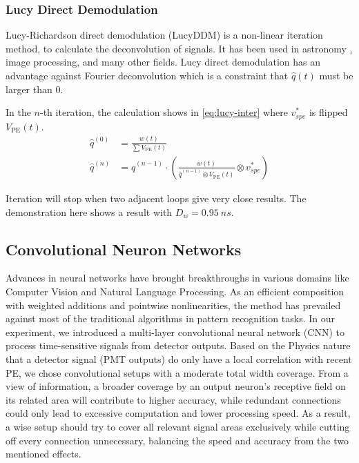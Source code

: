\subsubsection{Lucy Direct Demodulation}

Lucy-Richardson direct demodulation (LucyDDM) is a non-linear iteration method, to calculate the deconvolution of signals. It has been used in astronomy \cite{li_richardson-lucy_2019}, image processing, and many other fields. Lucy direct demodulation has an advantage against Fourier deconvolution which is a constraint that $\hat{q}(t)$ must be larger than 0. 

In the $n$-th iteration, the calculation shows in \eqref{eq:lucy-inter} where $v^{*}_{spe}$ is flipped $V_\mathrm{PE}(t)$. 
\begin{align}
    \hat{q}^{(0)} &= \frac{w(t)}{\sum V_\mathrm{PE}(t)} \\
    \hat{q}^{(n)} &= \hat{q}^{(n-1)} \cdot \left(\frac{w(t)}{\hat{q}^{(n-1)} \otimes V_\mathrm{PE}(t)} \otimes v^{*}_{spe}\right) \label{eq:lucy-inter}
\end{align}

Iteration will stop when two adjacent loops give very close results. The demonstration here shows a result with $D_w = \SI{0.95}{ns}$. 

\subsection{Convolutional Neuron Networks}

Advances in neural networks have brought breakthroughs in various domains like Computer Vision and Natural Language Processing. As an efficient composition with weighted additions and pointwise nonlinearities, the method has prevailed against most of the traditional algorithms in pattern recognition tasks. In our experiment, we introduced a multi-layer convolutional neural network (CNN) to process time-sensitive signals from detector outputs. Based on the Physics nature that a detector signal (PMT outputs) do only have a local correlation with recent PE, we chose convolutional setups with a moderate total width coverage. From a view of information, a broader coverage by an output neuron's receptive field on its related area will contribute to higher accuracy, while redundant connections could only lead to excessive computation and lower processing speed. As a result, a wise setup should try to cover all relevant signal areas exclusively while cutting off every connection unnecessary, balancing the speed and accuracy from the two mentioned effects.

